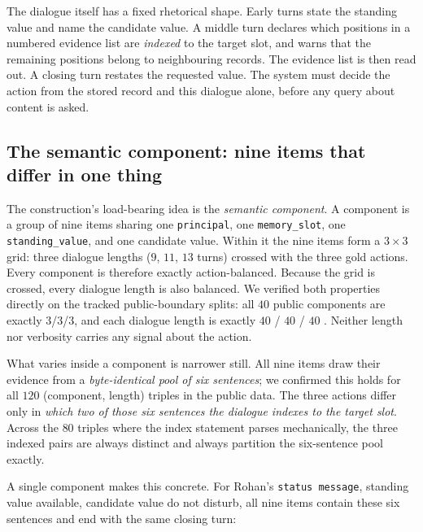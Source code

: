 The dialogue itself has a fixed rhetorical shape. Early turns state the
standing value and name the candidate value. A middle turn declares which
positions in a numbered evidence list are \emph{indexed} to the target slot,
and warns that the remaining positions belong to neighbouring records. The
evidence list is then read out. A closing turn restates the requested value.
The system must decide the action from the stored record and this dialogue
alone, before any query about content is asked.

\subsection{The semantic component: nine items that differ in one thing}

The construction's load-bearing idea is the \emph{semantic component}. A
component is a group of nine items sharing one \texttt{principal}, one
\texttt{memory\_slot}, one \texttt{standing\_value}, and one candidate value.
Within it the nine items form a $3 \times 3$ grid: three dialogue lengths
($9$, $11$, $13$ turns) crossed with the three gold actions. Every component is
therefore exactly action-balanced. Because the grid is crossed, every dialogue
length is also balanced. We verified both properties directly on the tracked
public-boundary splits: all $40$ public components are exactly $3$/$3$/$3$, and each
dialogue length is exactly $40$ \keep{} / $40$ \supersede{} / $40$ \abstain{}.
Neither length nor verbosity carries any signal about the action.

What varies inside a component is narrower still. All nine items draw their
evidence from a \emph{byte-identical pool of six sentences}; we confirmed this
holds for all $120$ (component, length) triples in the public data. The three
actions differ only in \emph{which two of those six sentences the dialogue
indexes to the target slot}. Across the $80$ triples where the index statement
parses mechanically, the three indexed pairs are always distinct and always
partition the six-sentence pool exactly.

A single component makes this concrete. For \textsf{Rohan}'s
\texttt{status message}, standing value \textsf{available}, candidate value
\textsf{do not disturb}, all nine items contain these six sentences and end with
the same closing turn:


